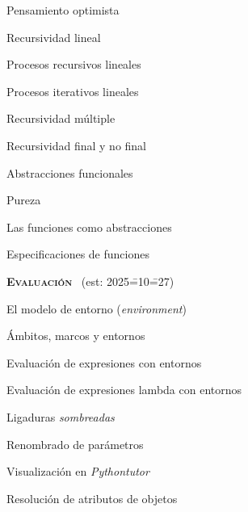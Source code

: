 \begin{longenum}
\begin{longenum}
\begin{longenum}
\begin{longenum}
                \item Pensamiento optimista
            \end{longenum}
            \item Recursividad lineal
            \begin{longenum}
                \item Procesos recursivos lineales \opcional\
                \item Procesos iterativos lineales \opcional\
            \end{longenum}
            \item Recursividad múltiple
            \item Recursividad final y no final \opcional\
        \end{longenum}
        \item Abstracciones funcionales
        \begin{longenum}
            \item Pureza
            \item Las funciones como abstracciones
            \begin{longenum}
                \item Especificaciones de funciones
            \end{longenum}
        \end{longenum}
    \end{longenum}
    \item \textbf{\textsc{Evaluación}} \ (est: 2025\==10\==27)
    \begin{longenum}
        \item El modelo de entorno (\textit{environment})
        \begin{longenum}
            \item Ámbitos, marcos y entornos
            \item Evaluación de expresiones con entornos
            \item Evaluación de expresiones lambda con entornos
            \begin{longenum}
                \item Ligaduras \textit{sombreadas}
                \item Renombrado de parámetros
                \item Visualización en \textit{Pythontutor}
            \end{longenum}
        \end{longenum}
        \item Resolución de atributos de objetos

\end{longenum}
\end{longenum}

